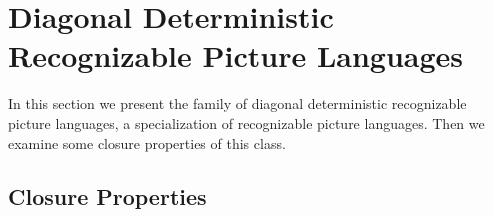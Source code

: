 \section{Diagonal Deterministic Recognizable Picture Languages}
In this section we present the family of diagonal deterministic recognizable picture languages, a
specialization of recognizable picture languages. Then we examine some closure properties of this
class.


\subsection{Closure Properties}
